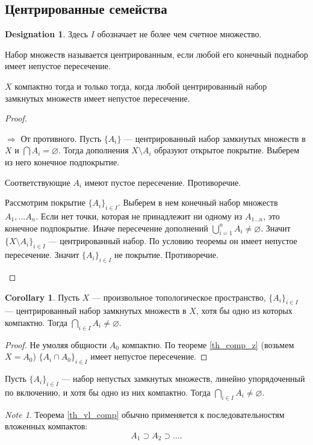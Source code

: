 \documentclass[11pt]{book}
\theoremstyle{definition}
\theoremstyle{plain}
\theoremstyle{plain}
\theoremstyle{definition}
\newtheorem*{cor}{Corollary}
\newtheorem*{name}{Designation}
\theoremstyle{remark}
\newtheorem*{note}{Note}
\begin{document}
\subsection{Центрированные семейства}
\begin{name}
    Здесь $ I$ обозначает не более чем счетное множество.
\end{name}
\begin{defn}
    Набор множеств называется  центрированным, если любой его конечный поднабор имеет непустое пересечение.
\end{defn}
\begin{thm}\label{th_comp_z}
    $ X$ компактно тогда и только тогда, когда любой центрированный набор замкнутых множеств имеет непустое пересечение.
\end{thm}
\begin{proof}
    $ $
    \begin{description}
	\item $ \boxed{ \Longrightarrow }$ От противного. Пусть $ \{A_i\}$ --- центрированный набор замкнутых множеств в $ X$ и  $ \bigcap A_i= \varnothing $. Тогда дополнения $ X \setminus A_i$ образуют открытое покрытие. Выберем из него конечное подпокрытие.

	    Соответствующие $ A_i$ имеют пустое пересечение.  Противоречие.
	\item \boxed {\Longrightarrow} Рассмотрим покрытие $ \{A_i\}_{i \in I}$. Выберем в нем конечный набор множеств $ A_1, \ldots A_n$. Если нет точки, которая не принадлежит ни одному из $ A_{1 \ldots  n}$, это конечное подпокрытие. Иначе пересечение дополнений $ \bigcup_{i=1}^{n} A_i \ne \varnothing$. Значит $ \{X \setminus A_i\}_{i \in I}$ --- центрированный набор. По условию теоремы он имеет непустое пересечение. Значит $ \{A_i\}_{i \in I} $ не покрытие. Противоречие.
    \end{description}
\end{proof}
\begin{cor}
    Пусть $ X$ --- произвольное  топологическое пространство, $ \{A_i\}_{i \in I}$ --- центрированный набор замкнутых множеств в $ X$, хотя бы одно из которых компактно.
    Тогда  $ \bigcap_{i \in  I} A_i \ne \varnothing$.
\end{cor}
\begin{proof}
    Не умоляя общности $ A_0$ компактно. По теореме \ref{th_comp_z} (возьмем $ X=A_0$)  $ \{A_i \cap A_0\}_{i \in  I}$ имеет непустое пересечение.
\end{proof}
\begin{thm}\label{th_vl_comp}
    Пусть $ \{A_i\}_{i \in  I}$ --- набор непустых замкнутых множеств, линейно упорядоченный по включению, и хотя бы одно из них компактно.
    Тогда $ \bigcap_{i \in  I} A_i \ne \varnothing $.
\end{thm}
\begin{note}
    Теорема \ref{th_vl_comp} обычно применяется к последовательностям вложенных компактов:
    \[
	A_1 \supset A_2 \supset \ldots
    .\]
\end{note}
\end{document}
